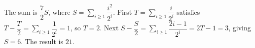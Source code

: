 The sum is $\dfrac{7}{2}S$, where $S=\sum_{i\ge1}\dfrac{i^2}{2^i}$. First $T=\sum_{i\ge1}\dfrac{i}{2^i}$ satisfies $T-\dfrac{T}{2}=\sum_{i\ge1}\dfrac{1}{2^i}=1$, so $T=2$. Next $S-\dfrac{S}{2}=\sum_{i\ge1}\dfrac{2i-1}{2^i}=2T-1=3$, giving $S=6$. The result is $\boxed{21}$.

